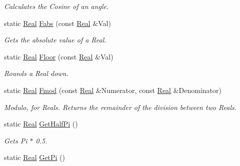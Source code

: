 \begin{DoxyCompactItemize}
\begin{DoxyCompactList}\small\item\em Calculates the Cosine of an angle. \item\end{DoxyCompactList}\item 
static \hyperlink{namespacephys_af7eb897198d265b8e868f45240230d5f}{Real} \hyperlink{classphys_1_1MathTool_a8304f680a03ec49a284564ad4a1d21f8}{Fabs} (const \hyperlink{namespacephys_af7eb897198d265b8e868f45240230d5f}{Real} \&Val)
\begin{DoxyCompactList}\small\item\em Gets the absolute value of a Real. \item\end{DoxyCompactList}\item 
static \hyperlink{namespacephys_af7eb897198d265b8e868f45240230d5f}{Real} \hyperlink{classphys_1_1MathTool_a551b68b7ff6934c450a1d15dc3c8a33c}{Floor} (const \hyperlink{namespacephys_af7eb897198d265b8e868f45240230d5f}{Real} \&Val)
\begin{DoxyCompactList}\small\item\em Rounds a Real down. \item\end{DoxyCompactList}\item 
static \hyperlink{namespacephys_af7eb897198d265b8e868f45240230d5f}{Real} \hyperlink{classphys_1_1MathTool_ad1d294ffae4b40b13b745f65e27372c1}{Fmod} (const \hyperlink{namespacephys_af7eb897198d265b8e868f45240230d5f}{Real} \&Numerator, const \hyperlink{namespacephys_af7eb897198d265b8e868f45240230d5f}{Real} \&Denominator)
\begin{DoxyCompactList}\small\item\em Modulo, for Reals. Returns the remainder of the division between two Reals. \item\end{DoxyCompactList}\item 
static \hyperlink{namespacephys_af7eb897198d265b8e868f45240230d5f}{Real} \hyperlink{classphys_1_1MathTool_a38e1c4e2ff8827e915ddfbd7fb8037cd}{GetHalfPi} ()
\begin{DoxyCompactList}\small\item\em Gets Pi $\ast$ 0.5. \item\end{DoxyCompactList}\item 
static \hyperlink{namespacephys_af7eb897198d265b8e868f45240230d5f}{Real} \hyperlink{classphys_1_1MathTool_a322cfb38abc59cc8e6e20cc95a53c976}{GetPi} ()

\end{DoxyCompactItemize}
